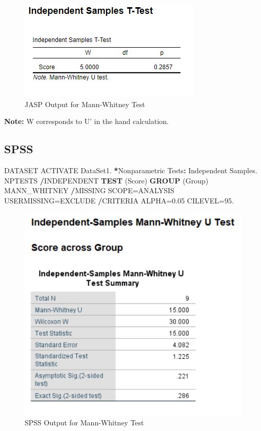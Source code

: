 \documentclass[
]{book}
\newenvironment{Shaded}{\begin{snugshade}}{\end{snugshade}}
\newcommand{\FloatTok}[1]{\textcolor[rgb]{0.00,0.00,0.81}{#1}}
\newcommand{\KeywordTok}[1]{\textcolor[rgb]{0.13,0.29,0.53}{\textbf{#1}}}
\newcommand{\NormalTok}[1]{#1}
\newcommand{\OperatorTok}[1]{\textcolor[rgb]{0.81,0.36,0.00}{\textbf{#1}}}
\newcommand{\StringTok}[1]{\textcolor[rgb]{0.31,0.60,0.02}{#1}}
\begin{document}
\begin{figure}[!h]
\includegraphics{Screenshots/Mann WHitney/mwtJASP} \caption{\label{fig:mwtJASP}JASP Output for Mann-Whitney Test}\label{fig:mwtJASP}
\end{figure}

\textbf{Note:} W corresponds to U' in the hand calculation.

\hypertarget{spss-1}{%
\subsection{SPSS}\label{spss-1}}

\begin{Shaded}
\begin{Highlighting}[]
\NormalTok{DATASET ACTIVATE DataSet1.}
\OperatorTok{*}\NormalTok{Nonparametric Tests}\OperatorTok{:}\StringTok{ }\NormalTok{Independent Samples. }
\NormalTok{NPTESTS }
  \OperatorTok{/}\NormalTok{INDEPENDENT }\KeywordTok{TEST}\NormalTok{ (Score) }\KeywordTok{GROUP}\NormalTok{ (Group) MANN_WHITNEY }
  \OperatorTok{/}\NormalTok{MISSING SCOPE=ANALYSIS USERMISSING=EXCLUDE}
  \OperatorTok{/}\NormalTok{CRITERIA ALPHA=}\FloatTok{0.05}\NormalTok{  CILEVEL=}\FloatTok{95.}
\end{Highlighting}
\end{Shaded}

\begin{figure}[!h]
\includegraphics{Screenshots/Mann WHitney/mwtSPSS} \caption{\label{fig:mwtSPSS}SPSS Output for Mann-Whitney Test}\label{fig:mwtSPSS}
\end{figure}
\end{document}
